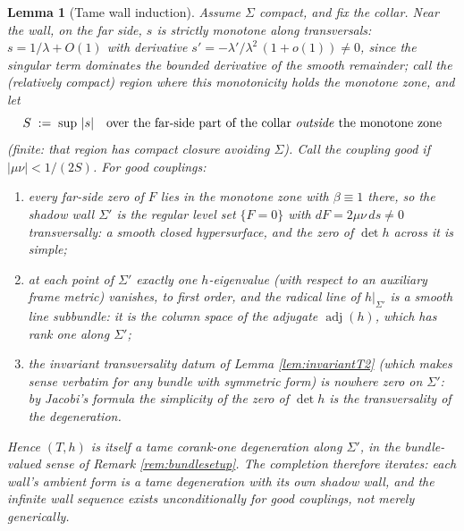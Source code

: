\documentclass[11pt]{article}
\newtheorem{lemma}[theorem]{Lemma}
\theoremstyle{definition}
\newcommand{\Sig}{\Sigma}
\begin{document}
\begin{lemma}[Tame wall induction]\label{lem:wallinduction}
Assume $\Sig$ compact, and fix the collar. Near the wall, on the far side, $s$ is strictly monotone along transversals: $s = 1/\lambda + O(1)$ with derivative $s' = -\lambda'/\lambda^2\,(1 + o(1)) \neq 0$, since the singular term dominates the bounded derivative of the smooth remainder; call the (relatively compact) region where this monotonicity holds the \emph{monotone zone}, and let
\[
S \;:=\; \sup\,|s| \quad\text{over the far-side part of the collar \emph{outside} the monotone zone}
\]
(finite: that region has compact closure avoiding $\Sig$). Call the coupling \emph{good} if $|\mu\nu| < 1/(2S)$. For good couplings:
\begin{enumerate}
\item every far-side zero of $F$ lies in the monotone zone with $\beta \equiv 1$ there, so the shadow wall $\Sig'$ is the regular level set $\{F = 0\}$ with $dF = 2\mu\nu\,ds \neq 0$ transversally: a smooth closed hypersurface, and the zero of $\det h$ across it is simple;
\item at each point of $\Sig'$ exactly one $h$-eigenvalue (with respect to an auxiliary frame metric) vanishes, to first order, and the radical line of $h|_{\Sig'}$ is a smooth line subbundle: it is the column space of the adjugate $\operatorname{adj}(h)$, which has rank one along $\Sig'$;
\item the invariant transversality datum of Lemma \ref{lem:invariantT2} (which makes sense verbatim for any bundle with symmetric form) is nowhere zero on $\Sig'$: by Jacobi's formula the simplicity of the zero of $\det h$ \emph{is} the transversality of the degeneration.
\end{enumerate}
Hence $(T, h)$ is itself a tame corank-one degeneration along $\Sig'$, in the bundle-valued sense of Remark \ref{rem:bundlesetup}. The completion therefore iterates: each wall's ambient form is a tame degeneration with its own shadow wall, and the infinite wall sequence exists unconditionally for good couplings, not merely generically.
\end{lemma}
\end{document}
